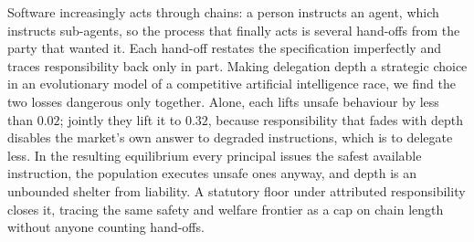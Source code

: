 
\noindent
Software increasingly acts through chains: a person instructs an agent, which
instructs sub-agents, so the process that finally acts is several hand-offs from
the party that wanted it. Each hand-off restates the specification imperfectly
and traces responsibility back only in part. Making delegation depth a strategic
choice in an evolutionary model of a competitive artificial intelligence race,
we find the two losses dangerous only together. Alone, each lifts unsafe
behaviour by less than $0.02$; jointly they lift it to $0.32$, because
responsibility that fades with depth disables the market's own answer to
degraded instructions, which is to delegate less. In the resulting equilibrium
every principal issues the safest available instruction, the population executes
unsafe ones anyway, and depth is an unbounded shelter from liability. A
statutory floor under attributed responsibility closes it, tracing the same
safety and welfare frontier as a cap on chain length without anyone counting
hand-offs.

